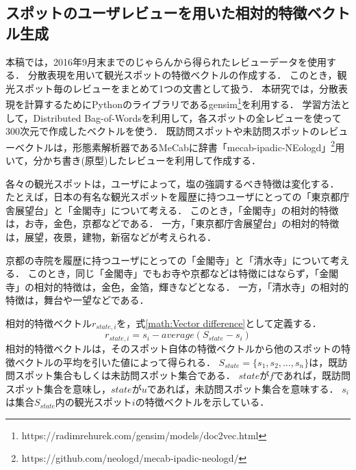 \documentclass[submit]{ipsj}
\begin{document}
\subsection{スポットのユーザレビューを用いた相対的特徴ベクトル生成}
\label{subsec:スポットのレビューから相対的特徴ベクトル生成}
本稿では，2016年9月末までのじゃらんから得られたレビューデータを使用する．
分散表現\cite{Codd06}を用いて観光スポットの特徴ベクトルの作成する．
このとき，観光スポット毎のレビューをまとめて1つの文書として扱う．
本研究では，分散表現を計算するためにPythonのライブラリであるgensim\footnote{https://radimrehurek.com/gensim/models/doc2vec.html}を利用する．
学習方法として，Distributed Bag-of-Wordsを利用して，各スポットの全レビューを使って300次元で作成したベクトルを使う．
既訪問スポットや未訪問スポットのレビューベクトルは，形態素解析器であるMeCab\cite{Codd07}に辞書「mecab-ipadic-NEologd」\footnote{https://github.com/neologd/mecab-ipadic-neologd/}用いて，分かち書き(原型)したレビューを利用して作成する．

各々の観光スポットは，ユーザによって，塩の強調するべき特徴は変化する．
たとえば，日本の有名な観光スポットを履歴に持つユーザにとっての「東京都庁舎展望台」と「金閣寺」について考える．
このとき，「金閣寺」の相対的特徴は，お寺，金色，京都などである．
一方，「東京都庁舎展望台」の相対的特徴は，展望，夜景，建物，新宿などが考えられる．

京都の寺院を履歴に持つユーザにとっての「金閣寺」と「清水寺」について考える．
このとき，同じ「金閣寺」でもお寺や京都などは特徴にはならず，「金閣寺」の相対的特徴は，金色，金箔，輝きなどとなる．
一方，「清水寺」の相対的特徴は，舞台や一望などである．

相対的特徴ベクトル$r_{state,i}$を，式\ref{math:Vector difference}として定義する．
\begin{equation}
  r_{state,i}=s_i-average(S_{state}-s_i)
  \label{math:Vector difference}
\end{equation}
相対的特徴ベクトルは，そのスポット自体の特徴ベクトルから他のスポットの特徴ベクトルの平均を引いた値によって得られる．
$S_{state} =\{s_1,s_2,\dots,s_n\}$は，既訪問スポット集合もしくは未訪問スポット集合である．
$state$が$f$であれば，既訪問スポット集合を意味し，$state$が$u$であれば，未訪問スポット集合を意味する．
$s_i$は集合$S_{state}$内の観光スポット$i$の特徴ベクトルを示している．
\end{document}
